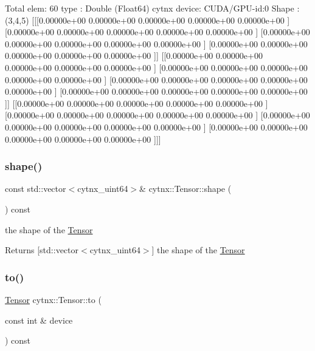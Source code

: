 \begin{DoxyVerbInclude}
Total elem: 60
type  : Double (Float64)
cytnx device: CUDA/GPU-id:0
Shape : (3,4,5)
[[[0.00000e+00 0.00000e+00 0.00000e+00 0.00000e+00 0.00000e+00 ]
  [0.00000e+00 0.00000e+00 0.00000e+00 0.00000e+00 0.00000e+00 ]
  [0.00000e+00 0.00000e+00 0.00000e+00 0.00000e+00 0.00000e+00 ]
  [0.00000e+00 0.00000e+00 0.00000e+00 0.00000e+00 0.00000e+00 ]]
 [[0.00000e+00 0.00000e+00 0.00000e+00 0.00000e+00 0.00000e+00 ]
  [0.00000e+00 0.00000e+00 0.00000e+00 0.00000e+00 0.00000e+00 ]
  [0.00000e+00 0.00000e+00 0.00000e+00 0.00000e+00 0.00000e+00 ]
  [0.00000e+00 0.00000e+00 0.00000e+00 0.00000e+00 0.00000e+00 ]]
 [[0.00000e+00 0.00000e+00 0.00000e+00 0.00000e+00 0.00000e+00 ]
  [0.00000e+00 0.00000e+00 0.00000e+00 0.00000e+00 0.00000e+00 ]
  [0.00000e+00 0.00000e+00 0.00000e+00 0.00000e+00 0.00000e+00 ]
  [0.00000e+00 0.00000e+00 0.00000e+00 0.00000e+00 0.00000e+00 ]]]





\end{DoxyVerbInclude}
 \mbox{\label{classcytnx_1_1Tensor_a6d0ab6d09633ad4d6099aa822ec5335a}} 
\subsubsection{\texorpdfstring{shape()}{shape()}}
{\footnotesize\ttfamily const std\+::vector$<$cytnx\+\_\+uint64$>$\& cytnx\+::\+Tensor\+::shape (\begin{DoxyParamCaption}{ }\end{DoxyParamCaption}) const\hspace{0.3cm}{\ttfamily [inline]}}



the shape of the \hyperlink{classcytnx_1_1Tensor}{Tensor} 

\begin{DoxyReturn}{Returns}
\mbox{[}std\+::vector$<$cytnx\+\_\+uint64$>$\mbox{]} the shape of the \hyperlink{classcytnx_1_1Tensor}{Tensor} 
\end{DoxyReturn}
\mbox{\label{classcytnx_1_1Tensor_acf7f697a9434f9bc98a7d00a555ee982}} 
\subsubsection{\texorpdfstring{to()}{to()}}
{\footnotesize\ttfamily \hyperlink{classcytnx_1_1Tensor}{Tensor} cytnx\+::\+Tensor\+::to (\begin{DoxyParamCaption}\item[{const int \&}]{device }\end{DoxyParamCaption}) const\hspace{0.3cm}{\ttfamily [inline]}}



